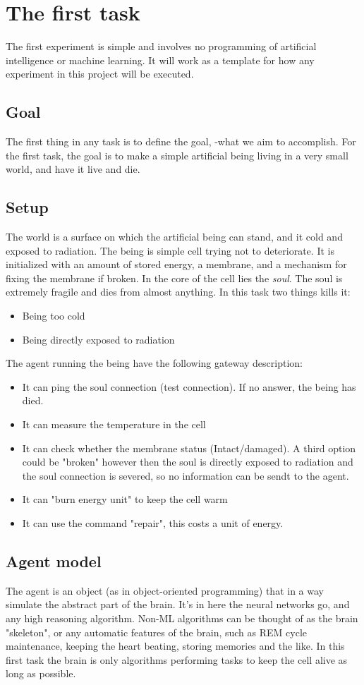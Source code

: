 \documentclass{article}
\newcommand{\sidenote}[1]{\textit{#1}\marginnote{\textbf{#1}}}
\begin{document}
	\section{The first task}
	The first experiment is simple and involves no programming of artificial intelligence or machine learning. It will work as a template for how any experiment in this project will be executed.
	\subsection{Goal}
	The first thing in any task is to define the goal, -what we aim to accomplish. For the first task, the goal is to make a simple artificial being living in a very small world, and have it live and die. 
	\subsection{Setup}
	The world is a surface on which the artificial being can stand, and it cold and exposed to radiation. The being is simple cell trying not to deteriorate. It is initialized with an amount of stored energy, a membrane, and a mechanism for fixing the membrane if broken. In the core of the cell lies the \sidenote{soul}. The soul is extremely fragile and dies from almost anything. In this task two things kills it: 
	\begin{itemize}
		\item Being too cold
		\item Being directly exposed to radiation
	\end{itemize}
	The agent running the being have the following gateway description:
	\begin{itemize}
		\item It can ping the soul connection (test connection). If no answer, the being has died.
		\item It can measure the temperature in the cell
		\item It can check whether the membrane status (Intact/damaged). A third option could be "broken" however then the soul is directly exposed to radiation and the soul connection is severed, so no information can be sendt to the agent.
		\item It can "burn energy unit" to keep the cell warm
		\item It can use the command "repair", this costs a unit of energy.
	\end{itemize}
	\subsection{Agent model}
	The agent is an object (as in object-oriented programming) that in a way simulate the abstract part of the brain. It's in here the neural networks go, and any high reasoning algorithm. Non-ML algorithms can be thought of as the brain "skeleton", or any automatic features of the brain, such as REM cycle maintenance, keeping the heart beating, storing memories and the like. In this first task the brain is only algorithms performing tasks to keep the cell alive as long as possible. 
\end{document}
